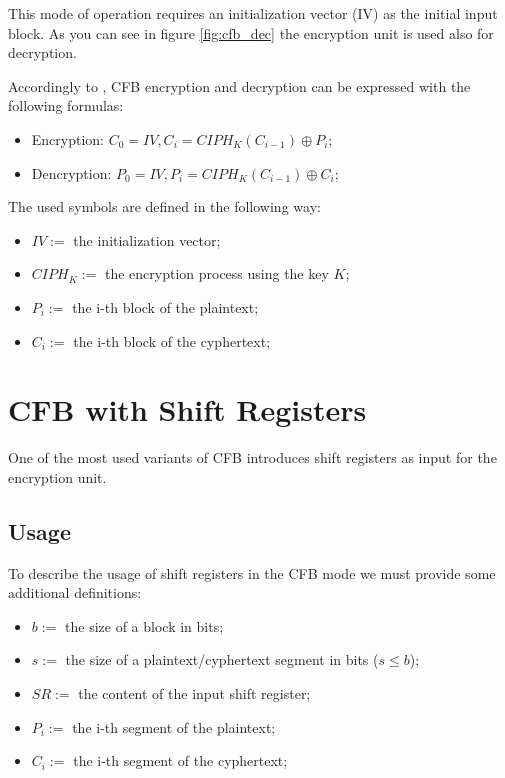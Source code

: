 \documentclass[11pt]{article}
\newcommand\CIPH{C\!I\!P\!H_K}
\begin{document}
This mode of operation requires an initialization vector (IV) as the initial input block. As you can see in figure \ref{fig:cfb_dec} the encryption unit is used also for decryption.

Accordingly to \cite{wiki}, CFB encryption and decryption can be expressed with the following formulas:

\begin{itemize}
\item Encryption: $C_0 = IV , C_i = \CIPH(C_{i-1}) \oplus P_i$;
\item Dencryption: $P_0 = IV , P_i = \CIPH(C_{i-1}) \oplus C_i$;
\end{itemize}

The used symbols are defined in the following way:

\begin{itemize}
\item $IV := $ the initialization vector;
\item $\CIPH := $ the encryption process using the key $K$;
\item $P_i := $ the i-th block of the plaintext;
\item $C_i := $ the i-th block of the cyphertext;
\end{itemize}

\section{CFB with Shift Registers}

One of the most used variants of CFB introduces shift registers as input for the encryption unit.

\subsection{Usage}

To describe the usage of shift registers in the CFB mode we must provide some additional definitions:

\begin{itemize}
\item $b := $ the size of a block in bits;
\item $s := $ the size of a plaintext/cyphertext segment in bits ($s \le b$);
\item $SR := $ the content of the input shift register;
\item $P_i := $ the i-th segment of the plaintext;
\item $C_i := $ the i-th segment of the cyphertext;
\end{itemize}
\end{document}
